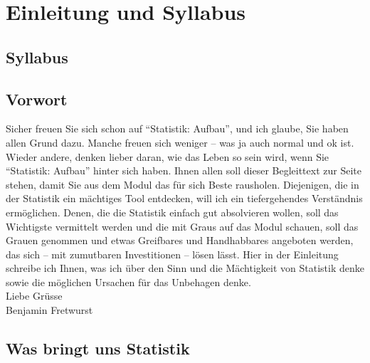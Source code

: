 \documentclass[
  10pt,
  letterpaper,
  a4paper, twoside]{scrreprt}
\begin{document}
\chapter*{Einleitung und Syllabus}\label{einleitung-und-syllabus}


\section*{Syllabus}\label{syllabus}


\section*{Vorwort}\label{vorwort}


Sicher freuen Sie sich schon auf \enquote{Statistik: Aufbau}, und ich
glaube, Sie haben allen Grund dazu. Manche freuen sich weniger -- was ja
auch normal und ok ist. Wieder andere, denken lieber daran, wie das
Leben so sein wird, wenn Sie \enquote{Statistik: Aufbau} hinter sich
haben. Ihnen allen soll dieser Begleittext zur Seite stehen, damit Sie
aus dem Modul das für sich Beste rausholen. Diejenigen, die in der
Statistik ein mächtiges Tool entdecken, will ich ein tiefergehendes
Verständnis ermöglichen. Denen, die die Statistik einfach gut
absolvieren wollen, soll das Wichtigste vermittelt werden und die mit
Graus auf das Modul schauen, soll das Grauen genommen und etwas
Greifbares und Handhabbares angeboten werden, das sich -- mit zumutbaren
Investitionen -- lösen lässt. Hier in der Einleitung schreibe ich Ihnen,
was ich über den Sinn und die Mächtigkeit von Statistik denke sowie die
möglichen Ursachen für das Unbehagen denke.\\
\noindent Liebe Grüsse\\
Benjamin Fretwurst

\section*{Was bringt uns Statistik}\label{was-bringt-uns-statistik}

\end{document}
